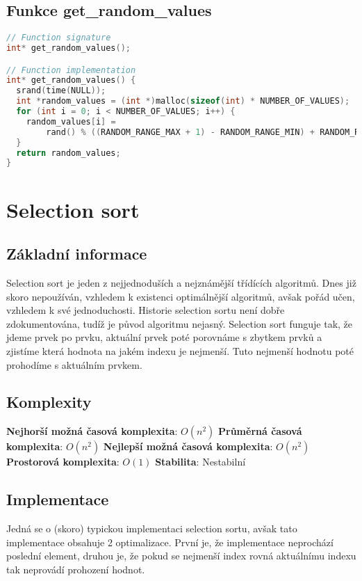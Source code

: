 \documentclass[11pt]{article}
\begin{document}
\subsection{Funkce get\_random\_values}
\begin{lstlisting}[language=C]
// Function signature
int* get_random_values();

// Function implementation
int* get_random_values() {
  srand(time(NULL));
  int *random_values = (int *)malloc(sizeof(int) * NUMBER_OF_VALUES);
  for (int i = 0; i < NUMBER_OF_VALUES; i++) {
    random_values[i] =
        rand() % ((RANDOM_RANGE_MAX + 1) - RANDOM_RANGE_MIN) + RANDOM_RANGE_MIN;
  }
  return random_values;
}
\end{lstlisting}

\pagebreak

\section{Selection sort}
\subsection{Základní informace}
Selection sort je jeden z nejjednoduších a nejznámější třídících algoritmů.
Dnes již skoro nepoužíván, vzhledem k existenci optimálnější algoritmů,
avšak pořád učen, vzhledem k své jednoduchosti.
Historie selection sortu není dobře zdokumentována, tudíž je původ algoritmu nejasný.
Selection sort funguje tak, že jdeme prvek po prvku, aktuální prvek poté porovnáme
s zbytkem prvků a zjistíme která hodnota na jakém indexu je nejmenší.
Tuto nejmenší hodnotu poté prohodíme s aktuálním prvkem.

\subsection{Komplexity}
\medbreak
\textbf{Nejhorší možná časová komplexita}: $O(n^2)$
\medbreak\noindent
\textbf{Průměrná časová komplexita}: $O(n^2)$
\medbreak\noindent
\textbf{Nejlepší možná časová komplexita}: $O(n^2)$
\medbreak\noindent
\textbf{Prostorová komplexita}: $O(1)$
\medbreak\noindent
\textbf{Stabilita}: Nestabilní
\medbreak

\subsection{Implementace}
Jedná se o (skoro) typickou implementaci selection sortu, avšak tato implementace 
obsahuje 2 optimalizace. První je, že implementace neprochází poslední element, 
druhou je, že pokud se nejmenší index rovná aktuálnímu indexu tak 
neprovádí prohození hodnot.
\end{document}

